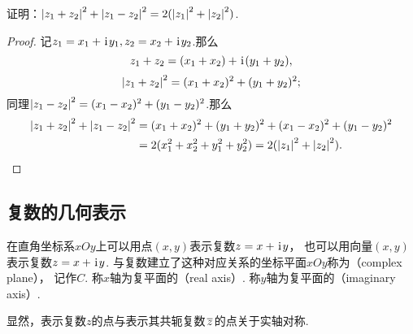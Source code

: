 \begin{example}
证明：\(\abs{z_1+z_2}^2 + \abs{z_1-z_2}^2 = 2 (\abs{z_1}^2 + \abs{z_2}^2)\).
\begin{proof}
记\(z_1 = x_1 + \kern1pt\mathrm{i}\kern1pt y_1, z_2 = x_2 + \kern1pt\mathrm{i}\kern1pt y_2\).那么\[
z_1+z_2 = (x_1+x_2) + \kern1pt\mathrm{i}\kern1pt(y_1+y_2),
\]\[
\abs{z_1+z_2}^2 = (x_1+x_2)^2 + (y_1+y_2)^2;
\]同理\(\abs{z_1-z_2}^2 = (x_1-x_2)^2 + (y_1-y_2)^2\).那么\begin{align*}
\abs{z_1+z_2}^2 + \abs{z_1-z_2}^2
&= (x_1+x_2)^2 + (y_1+y_2)^2
+ (x_1-x_2)^2 + (y_1-y_2)^2 \\
&= 2 ( x_1^2 + x_2^2 + y_1^2 + y_2^2 )
= 2 ( \abs{z_1}^2 + \abs{z_2}^2 ).
\qedhere
\end{align*}
\end{proof}
\end{example}

\subsection{复数的几何表示}
\begin{definition}[复数在复平面上的几何表示]
在直角坐标系\(xOy\)上可以用点\((x,y)\)表示复数\(z=x+\kern1pt\mathrm{i}\kern1pt y\)，
也可以用向量\((x,y)\)表示复数\(z=x+\kern1pt\mathrm{i}\kern1pt y\).
与复数建立了这种对应关系的坐标平面\(xOy\)称为（complex plane），
记作\(C\).
称\(x\)轴为复平面的（real axis）.
称\(y\)轴为复平面的（imaginary axis）.

显然，表示复数\(z\)的点与表示其共轭复数\(\kern1pt\overline{z}\kern1pt\)的点关于实轴对称.
\end{definition}


